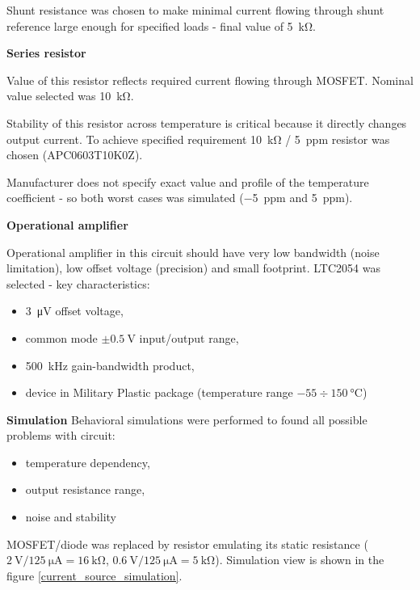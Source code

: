         Shunt resistance was chosen to make minimal current flowing through shunt reference large enough for specified loads - final value of \SI{5}{\kilo\ohm}.

        \bigskip \textbf{Series resistor}

        Value of this resistor reflects required current flowing through MOSFET. Nominal value selected was \SI{10}{\kilo\ohm}.

        Stability of this resistor across temperature is critical because it directly changes output current. To achieve specified requirement \SI{10}{\kilo\ohm} / \SI{5}{ppm} resistor was chosen (APC0603T10K0Z).

        Manufacturer does not specify exact value and profile of the temperature coefficient - so both worst cases was simulated (\SI{-5}{ppm} and \SI{5}{ppm}).

        \bigskip \textbf{Operational amplifier}

        Operational amplifier in this circuit should have very low bandwidth (noise limitation), low offset voltage (precision) and small footprint. LTC2054 was selected - key characteristics:
        \begin{itemize}
            \item \SI{3}{\micro\volt} offset voltage,
            \item common mode $\pm \SI{0.5}{\volt}$ input/output range,
            \item \SI{500}{\kilo\hertz} gain-bandwidth product,
            \item device in Military Plastic package (temperature range $-55 \div \SI{150}{\degreeCelsius}$)
        \end{itemize}

        \bigskip \textbf{Simulation}
        Behavioral simulations were performed to found all possible problems with circuit:
        \begin{itemize}
            \item temperature dependency,
            \item output resistance range,
            \item noise and stability
        \end{itemize}

        MOSFET/diode was replaced by resistor emulating its static resistance ($\SI{2}{\volt}/\SI{125}{\micro\ampere} = \SI{16}{\kilo\ohm}$, $\SI{0.6}{\volt}/\SI{125}{\micro\ampere} = \SI{5}{\kilo\ohm}$). Simulation view is shown in the figure \ref{current_source_simulation}.

